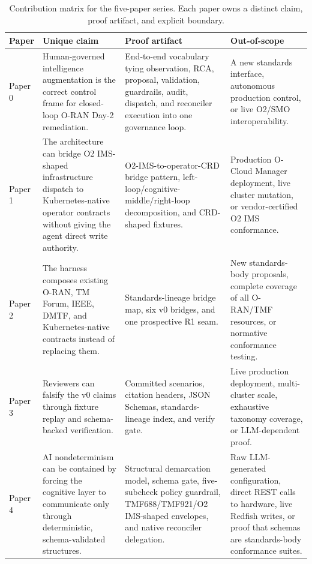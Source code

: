 \documentclass[twocolumn,10pt,a4paper]{article}
\begin{document}
\begin{table}[t]
\centering
\small
\begin{tabularx}{\textwidth}{p{1.4cm}X X X}
\toprule
Paper & Unique claim & Proof artifact & Out-of-scope \\
\midrule
Paper 0 & Human-governed intelligence augmentation is the correct control frame for closed-loop O-RAN Day-2 remediation. & End-to-end vocabulary tying observation, RCA, proposal, validation, guardrails, audit, dispatch, and reconciler execution into one governance loop. & A new standards interface, autonomous production control, or live O2/SMO interoperability. \\
Paper 1 & The architecture can bridge O2 IMS-shaped infrastructure dispatch to Kubernetes-native operator contracts without giving the agent direct write authority. & O2-IMS-to-operator-CRD bridge pattern, left-loop/cognitive-middle/right-loop decomposition, and CRD-shaped fixtures. & Production O-Cloud Manager deployment, live cluster mutation, or vendor-certified O2 IMS conformance. \\
Paper 2 & The harness composes existing O-RAN, TM Forum, IEEE, DMTF, and Kubernetes-native contracts instead of replacing them. & Standards-lineage bridge map, six v0 bridges, and one prospective R1 seam. & New standards-body proposals, complete coverage of all O-RAN/TMF resources, or normative conformance testing. \\
Paper 3 & Reviewers can falsify the v0 claims through fixture replay and schema-backed verification. & Committed scenarios, citation headers, JSON Schemas, standards-lineage index, and verify gate. & Live production deployment, multi-cluster scale, exhaustive taxonomy coverage, or LLM-dependent proof. \\
Paper 4 & AI nondeterminism can be contained by forcing the cognitive layer to communicate only through deterministic, schema-validated structures. & Structural demarcation model, schema gate, five-subcheck policy guardrail, TMF688/TMF921/O2 IMS-shaped envelopes, and native reconciler delegation. & Raw LLM-generated configuration, direct REST calls to hardware, live Redfish writes, or proof that schemas are standards-body conformance suites. \\
\bottomrule
\end{tabularx}
\caption{Contribution matrix for the five-paper series. Each paper owns a distinct claim, proof artifact, and explicit boundary.}
\label{tab:contribution-matrix}
\end{table}
\end{document}
